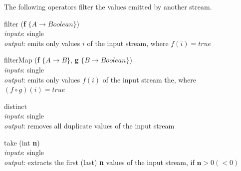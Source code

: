 \documentclass{dithesis}
\begin{document}
The following operators filter the values emitted by another stream.
\begin{description}

\begin{minipage}[c]{\lll}
\item[filter] (\textbf{f} $\{ A \to Boolean \}$) \\
	\textit{inputs}: single \\
	\textit{output}: emits only values $i$ of the input stream, where $f(i) = true$
\end{minipage}
\hfill
\begin{minipage}[c]{\rrr}

\end{minipage}
\newline \newline \newline
\begin{minipage}[c]{\lll}
\item[filterMap] (\textbf{f} $\{ A \to B \}$, \textbf{g} $\{ B \to Boolean \}$) \\
	\textit{inputs}: single \\
	\textit{output}: emits only values $f(i)$ of the input stream the, where $(f \circ g)(i) = true$
\end{minipage}
\hfill
\newline \newline \newline
\begin{minipage}[c]{\lll}
\item[distinct] ~\\
	\textit{inputs}: single \\
	\textit{output}: removes all duplicate values of the input stream		
\end{minipage}
\hfill
\begin{minipage}[c]{\rrr}

\end{minipage}
\newline \newline \newline
\begin{minipage}[c]{\lll}
\item[take] (int \textbf{n}) \\
	\textit{inputs}: single \\
	\textit{output}: extracts the first (last) \textbf{n} values of the input stream, if $\textbf{n} > 0 (< 0)$			
\end{minipage}

\end{description}
\end{document}
